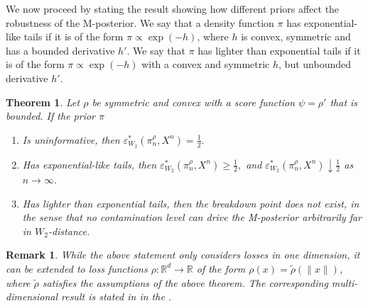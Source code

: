 \documentclass[11pt, oneside]{amsart}
\newtheorem{theorem}{Theorem}[]
\newtheorem{remark}{Remark}
\theoremstyle{definition}   %
\newcommand{\R}{\mathbb{R}}
\newcommand{\loss}{\rho}
\begin{document}
We now proceed by stating the result showing how different priors affect the robustness of the M-posterior. We say that  a density function $\pi$ has exponential-like tails if it is of the form \(\pi\propto \exp(-h) \), where \( h \) is convex, symmetric and has a bounded derivative \( h'\). We say that $\pi$ has lighter than exponential tails  if it is of the form \(\pi \propto \exp(-h) \) with a convex and symmetric \( h\), but unbounded derivative \( h'\).
%
\begin{theorem}
\label{thm::breakdown-point-convex-loss}
    Let $\rho$ be symmetric and convex with a score function $\psi = \rho'$ that is bounded. If the prior \( \pi \)
    \begin{enumerate}
        \item {Is uninformative}, then
        \(
            \varepsilon^*_{W_2}(\pi^{\rho}_n, X^n) = \frac{1}{2}.
        \)
        \item {Has exponential-like tails,} then
        \(
            \varepsilon^*_{W_2}(\pi^{\rho}_n, X^n) \ge \frac{1}{2}, 
        \)
        and
        \(
            \varepsilon^*_{W_2}(\pi^{\rho}_n, X^n) \downarrow \frac{1}{2}
        \)
        as \( n \rightarrow \infty.\)
        \item {Has lighter than exponential tails,} then the breakdown point does not exist, in the sense that no contamination level can drive the M-posterior arbitrarily far in $W_2$-distance.
    \end{enumerate}
\end{theorem}
%
\begin{remark}
    While the above statement only considers losses in one dimension, it can be extended to loss functions \( \loss : \R^d \to \R \) of the form \( \loss(x) = \widetilde{\loss}(\| x \|) \), where \( \widetilde{\loss} \) satisfies the assumptions of the above theorem. The corresponding multi-dimensional result is stated in  in the .
\end{remark}
\end{document}
